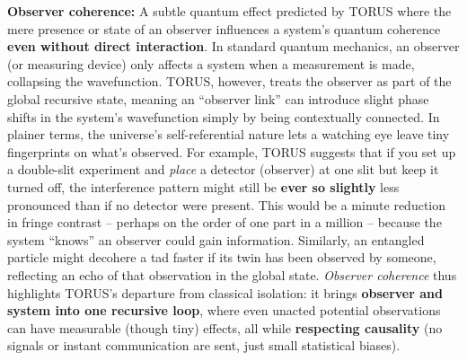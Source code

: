 \documentclass[
]{article}
\begin{document}
\textbf{Observer coherence:} A subtle quantum effect predicted by TORUS
where the mere presence or state of an observer influences a system's
quantum coherence \textbf{even without direct interaction}\hspace{0pt}.
In standard quantum mechanics, an observer (or measuring device) only
affects a system when a measurement is made, collapsing the
wavefunction. TORUS, however, treats the observer as part of the global
recursive state, meaning an ``observer link'' can introduce slight phase
shifts in the system's wavefunction simply by being contextually
connected\hspace{0pt}. In plainer terms, the universe's self-referential
nature lets a watching eye leave tiny fingerprints on what's observed.
For example, TORUS suggests that if you set up a double-slit experiment
and \emph{place} a detector (observer) at one slit but keep it turned
off, the interference pattern might still be \textbf{ever so slightly}
less pronounced than if no detector were present\hspace{0pt}. This would
be a minute reduction in fringe contrast -- perhaps on the order of one
part in a million -- because the system ``knows'' an observer could gain
information\hspace{0pt}. Similarly, an entangled particle might decohere
a tad faster if its twin has been observed by someone, reflecting an
echo of that observation in the global state. \emph{Observer coherence}
thus highlights TORUS's departure from classical isolation: it brings
\textbf{observer and system into one recursive loop}, where even unacted
potential observations can have measurable (though tiny) effects, all
while \textbf{respecting causality} (no signals or instant communication
are sent, just small statistical biases).
\end{document}
